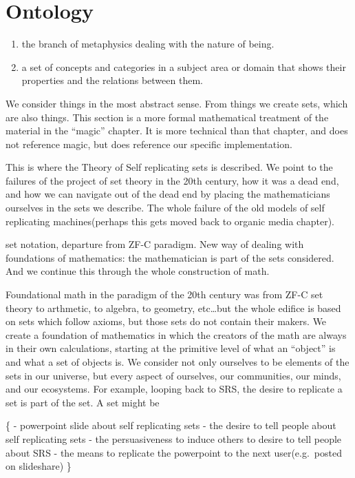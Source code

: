 \section{Ontology}\label{ontology}

\begin{enumerate}
\def\labelenumi{\arabic{enumi}.}
\tightlist
\item
  the branch of metaphysics dealing with the nature of being.
\item
  a set of concepts and categories in a subject area or domain that
  shows their properties and the relations between them.
\end{enumerate}

We consider things in the most abstract sense. From things we create
sets, which are also things. This section is a more formal mathematical
treatment of the material in the ``magic'' chapter. It is more technical
than that chapter, and does not reference magic, but does reference our
specific implementation.

This is where the Theory of Self replicating sets is described. We point
to the failures of the project of set theory in the 20th century, how it
was a dead end, and how we can navigate out of the dead end by placing
the mathematicians ourselves in the sets we describe. The whole failure
of the old models of self replicating machines(perhaps this gets moved
back to organic media chapter).

set notation, departure from ZF-C paradigm. New way of dealing with
foundations of mathematics: the mathematician is part of the sets
considered. And we continue this through the whole construction of math.

Foundational math in the paradigm of the 20th century was from ZF-C set
theory to arthmetic, to algebra, to geometry, etc\ldots{}but the whole
edifice is based on sets which follow axioms, but those sets do not
contain their makers. We create a foundation of mathematics in which the
creators of the math are always in their own calculations, starting at
the primitive level of what an ``object'' is and what a set of objects
is. We consider not only ourselves to be elements of the sets in our
universe, but every aspect of ourselves, our communities, our minds, and
our ecosystems. For example, looping back to SRS, the desire to
replicate a set is part of the set. A set might be

\{ - powerpoint slide about self replicating sets - the desire to tell
people about self replicating sets - the persuasiveness to induce others
to desire to tell people about SRS - the means to replicate the
powerpoint to the next user(e.g.~posted on slideshare) \}

